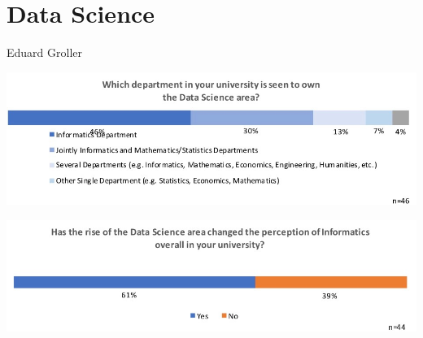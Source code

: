 \section{Data Science}

Eduard Groller

\includegraphics[width = \linewidth]{charts/4a.jpg}

\includegraphics[width = \linewidth]{charts/4b.jpg}


